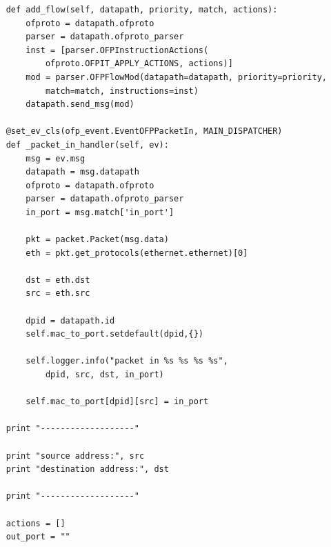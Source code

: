 \documentclass[a4,12pt]{scrartcl}
\begin{document}
\begin{lstlisting}
    def add_flow(self, datapath, priority, match, actions):
        ofproto = datapath.ofproto
        parser = datapath.ofproto_parser
        inst = [parser.OFPInstructionActions(
        	ofproto.OFPIT_APPLY_ACTIONS, actions)]
        mod = parser.OFPFlowMod(datapath=datapath, priority=priority, 
        	match=match, instructions=inst)
        datapath.send_msg(mod)

    @set_ev_cls(ofp_event.EventOFPPacketIn, MAIN_DISPATCHER)
    def _packet_in_handler(self, ev):
        msg = ev.msg
        datapath = msg.datapath
        ofproto = datapath.ofproto
        parser = datapath.ofproto_parser
        in_port = msg.match['in_port']

        pkt = packet.Packet(msg.data)
        eth = pkt.get_protocols(ethernet.ethernet)[0]

        dst = eth.dst
        src = eth.src

        dpid = datapath.id
        self.mac_to_port.setdefault(dpid,{})

        self.logger.info("packet in %s %s %s %s", 
        	dpid, src, dst, in_port)

        self.mac_to_port[dpid][src] = in_port

	print "-------------------"

	print "source address:", src
	print "destination address:", dst

	print "-------------------"

	actions = []
	out_port = ""


\end{lstlisting}
\end{document}
